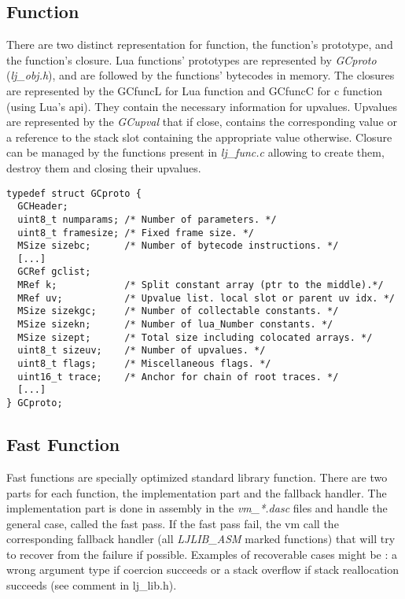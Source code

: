 
\subsection{Function}
\label{Subsec:func}

There are two distinct representation for function, the function's prototype,
and the function's closure. Lua functions' prototypes are represented by \emph{GCproto} (\emph{lj\_obj.h}), and are followed by the functions' bytecodes in memory.
The closures are represented by the GCfuncL for Lua function and GCfuncC for
c function (using Lua's api). They contain the necessary information for
upvalues. Upvalues are represented by the \emph{GCupval} that if close, contains
the corresponding value or a reference to the stack slot containing the
appropriate value otherwise. Closure can be managed by the functions present in
\emph{lj\_func.c} allowing to create them, destroy them and closing their
upvalues.

\begin{lstlisting}[style=CStyle]
typedef struct GCproto {
  GCHeader;
  uint8_t numparams; /* Number of parameters. */
  uint8_t framesize; /* Fixed frame size. */
  MSize sizebc;      /* Number of bytecode instructions. */
  [...]
  GCRef gclist;
  MRef k;            /* Split constant array (ptr to the middle).*/
  MRef uv;           /* Upvalue list. local slot or parent uv idx. */
  MSize sizekgc;     /* Number of collectable constants. */
  MSize sizekn;      /* Number of lua_Number constants. */
  MSize sizept;      /* Total size including colocated arrays. */
  uint8_t sizeuv;    /* Number of upvalues. */
  uint8_t flags;     /* Miscellaneous flags. */
  uint16_t trace;    /* Anchor for chain of root traces. */
  [...]
} GCproto;
\end{lstlisting}


\subsection{Fast Function}
\label{Subsec:ffunc}

Fast functions are specially optimized standard library function. There are two
parts for each function, the implementation part and the fallback handler.
The implementation part is done in assembly in the \emph{vm\_*.dasc} files and
handle the general case, called the fast pass. If the fast pass fail, the vm
call the corresponding fallback handler (all \emph{LJLIB\_ASM} marked functions)
that will try to recover from the failure if possible. Examples of recoverable
cases might be : a wrong argument type if coercion succeeds or a stack overflow
if stack reallocation succeeds (see comment in lj\_lib.h).

